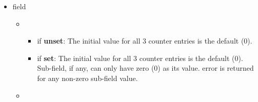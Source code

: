 \documentclass[11pt]{article}
\begin{document}
{\begin{itemize}
\begin{itemize}[noitemsep,topsep=\mdcompacttopsep]
\begin{itemize}[noitemsep,topsep=\mdcompacttopsep]
\item{}if \textbf{unset}: The response does not include the counter entry's value
( is unset in the response).%

\item{}if \textbf{set}: The response includes the counter entry's value read from
the target.%
\end{itemize}%
\end{itemize}%

\item{}
 field%

\begin{itemize}[noitemsep,topsep=\mdcompacttopsep]%

\item{}

\begin{itemize}[noitemsep,topsep=\mdcompacttopsep]%

\item{}if \textbf{unset}: The initial value for all 3 counter entries is the
default (0).%

\item{}if \textbf{set}: The initial value for all 3 counter entries is the
default (0). Sub-field, if any, can only have zero (0) as its value.
 error is returned for any non-zero sub-field value.%
\end{itemize}%

\item{}

\begin{itemize}[noitemsep,topsep=\mdcompacttopsep]%


\end{itemize}
\end{itemize}
\end{itemize}}
\end{document}
